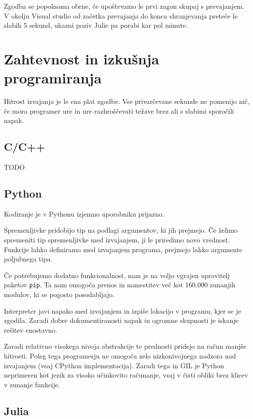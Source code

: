\documentclass[journal,a4paper,twoside]{sty/IEEEtran}
\begin{document}
Zgodba se popolnoma obrne, če upoštevamo le prvi zagon skupaj s prevajanjem.
V okolju Visual studio od začetka prevajanja do konca shranjevanja preteče le slabih 5 sekund, ukazni poziv Julie pa porabi kar pol minute.

\section{Zahtevnost in izkušnja programiranja}

Hitrost izvajanja je le ena plat zgodbe.
Vse privarčevane sekunde ne pomenijo nič, če mora programer ure in ure razhroščevati težave brez ali s slabimi sporočili napak.

\subsection{C/C++}

TODO

\subsection{Python}

Kodiranje je v Pythonu izjemno uporabniku prijazno.

Spremenljivke pridobijo tip na podlagi argumentov, ki jih prejmejo.
Če želimo spremeniti tip spremenljivke med izvajanjem, ji le priredimo novo vrednost.
Funkcije lahko definiramo med izvajanjem programa, prejmejo lahko argumente poljubnega tipa.

Če potrebujemo dodatno funkcionalnost, nam je na voljo vgrajen upravitelj paketov \texttt{pip}.
Ta nam omogoča prenos in namestitev več kot 160.000 zunanjih modulov, ki se pogosto posodabljajo.

Interpreter javi napako med izvajanjem in izpiše lokacijo v programu, kjer se je zgodila.
Zaradi dobre dokumentiranosti napak in ogromne skupnosti je iskanje rešitev enostavno.

Zaradi relativno visokega nivoja abstrakcije te prednosti pridejo na račun manjše hitrosti.
Poleg tega programerju ne omogoča zelo nizkonivojnega nadzora nad izvajanjem (vsaj CPython implementacija).
Zaradi tega in GIL je Python neprimeren kot jezik za visoko učinkovito računanje, vsaj v čisti obliki brez klicev v zunanje funkcije.

\subsection{Julia}
\end{document}

